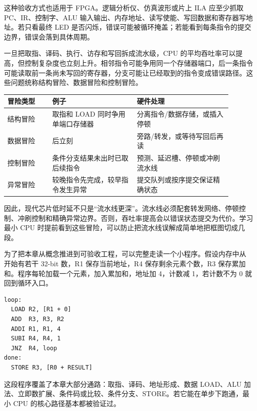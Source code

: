 这种验收方式也适用于 FPGA。逻辑分析仪、仿真波形或片上 ILA 应至少抓取 PC、IR、控制字、ALU 输入输出、内存地址、读写使能、写回数据和寄存器写地址。若只看最终 LED 是否闪烁，错误可能被循环掩盖；若能看到每条指令的提交边界，错误会落到具体周期。

一旦把取指、译码、执行、访存和写回拆成流水级，CPU 的平均吞吐率可以提高，但控制复杂度也立刻上升。相邻指令可能争用同一个存储器端口，后一条指令可能读取前一条尚未写回的寄存器，分支可能让已经取到的指令变成错误路径。这些问题统称结构冒险、数据冒险和控制冒险。

\begin{longtable}{L{0.18\linewidth}L{0.34\linewidth}L{0.38\linewidth}}
\toprule
冒险类型 & 例子 & 硬件处理 \\
\midrule
结构冒险 & 取指和 LOAD 同时争用单端口存储器 & 分离指令/数据存储，或插入停顿 \\
数据冒险 &  后立刻  & 旁路/转发，或等待写回后再读 \\
控制冒险 & 条件分支结果未出时已取后续指令 & 预测、延迟槽、停顿或冲刷流水线 \\
异常冒险 & 较晚指令先完成，较早指令发生异常 & 提交队列或按序提交保证精确状态 \\
\bottomrule
\end{longtable}

因此，现代芯片低时延不只是“流水线更深”。流水线必须配套转发网络、停顿控制、冲刷控制和精确异常边界。否则，吞吐率提高会以错误状态提交为代价。学习最小 CPU 时提前看到这些冒险，可以防止把流水线误解成简单地把框图切成几段。

为了把本章从概念推进到可验收工程，可以完整走读一个小程序。假设内存中从  开始有若干 32-bit 数，R1 保存当前地址，R4 保存剩余元素个数，R3 保存累加和。程序每轮加载一个元素，加入累加和，地址加 4，计数减 1，若计数不为 0 就回到循环入口。

\begin{lstlisting}
loop:
  LOAD R2, [R1 + 0]
  ADD  R3, R3, R2
  ADDI R1, R1, 4
  SUBI R4, R4, 1
  JNZ  R4, loop
done:
  STORE R3, [R0 + RESULT]
\end{lstlisting}

这段程序覆盖了本章大部分通路：取指、译码、地址形成、数据 LOAD、ALU 加法、立即数扩展、条件码或比较、条件分支、STORE。若它能在单步下跑通，最小 CPU 的核心路径基本都被验证过。

